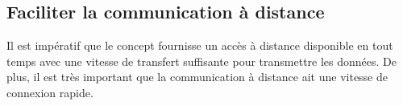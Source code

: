 

\subsection{Faciliter la communication à distance}
\label{s:beo_obj_distance}

Il est impératif que le concept fournisse un accès à distance disponible en tout temps avec une vitesse de transfert suffisante pour transmettre les données.
De plus, il est très important que la communication à distance ait une vitesse de connexion rapide.
